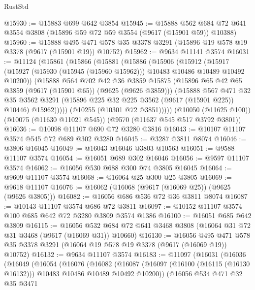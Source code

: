 \begin{lexlean}{RustStd}
\begin{coremodule}
{\begin{coremodule}
{{{{{{{{{{{{{{{{{{{{{{{{{{{{{{{{{@15930 := @15883 @699 @642 @3854
@15945 := @15888
    @562
    @684
    @72
    @641
    @3554
    @3808
    (@15896 @59 @72 @59 @3554 (@9617 (@15901 @59)) @10388)
@15960 := @15888
    @495
    @471
    @578
    @35
    @3378
    @3291
    (@15896 @19 @578 @19 @3378 (@9617 (@15901 @19)) @10752)
@15962 := @9634 @11141 @3574
@16031 := @11124
    (@15861
      (@15866
        (@15881
          (@15886
            (@15906
              (@15912
                (@15917
                  (@15927 (@15930 (@15945 (@15960 @15962))) @10483 @10486 @10489 @10492 @10200))
                (@15888
                  @564
                  @702
                  @42
                  @36
                  @3859
                  @15875
                  (@15896 @65 @42 @65 @3859 (@9617 (@15901 @65)) (@9625 (@9626 @3859)))
                  (@15888
                    @567
                    @471
                    @32
                    @35
                    @3562
                    @3291
                    (@15896 @225 @32 @225 @3562 (@9617 (@15901 @225)) @10446)
                    @15962)))))
          (@10255 (@10301 @72 @3851)))))
    (@10050 (@11625 @100))
    (@10075 (@11630 @11021 @545))
    (@9570 (@11637 @545 @517 @3792 @3801))
@16036 := @10098 @11107 @690 @72 @3280 @3816
@16043 := @10107 @11107 @3574 @545 @72 @689 @302 @3280
@16045 := @3287 @3811 @8074
@16046 := @3806 @16045
@16049 := @16043 @16046 @3803 @10563
@16051 := @9588 @11107 @3574
@16054 := @16051 @689 @302 @16046
@16056 := @9597 @11107 @3574
@16062 := @16056 @530 @688 @300 @74 @3805 @16045
@16064 := @9609 @11107 @3574
@16068 := @16064 @25 @300 @25 @3805
@16069 := @9618 @11107
@16076 := @16062 (@16068 (@9617 (@16069 @25)) (@9625 (@9626 @3805)))
@16082 := @16056 @686 @536 @72 @36 @3811 @8074
@16087 := @10143 @11107 @3574 @686 @72 @3811
@16097 := @10152 @11107 @3574 @100 @685 @642 @72 @3280 @3809 @3574 @1386
@16100 := @16051 @685 @642 @3809
@16115 := @16056
    @532
    @684
    @72
    @641
    @3468
    @3808
    (@16064 @31 @72 @31 @3468 (@9617 (@16069 @31)) @10660)
@16130 := @16056
    @495
    @471
    @578
    @35
    @3378
    @3291
    (@16064 @19 @578 @19 @3378 (@9617 (@16069 @19)) @10752)
@16132 := @9634 @11107 @3574
@16183 := @11097
    (@16031
      (@16036
        (@16049
          (@16054
            (@16076
              (@16082
                (@16087
                  (@16097 (@16100 (@16115 (@16130 @16132))) @10483 @10486 @10489 @10492 @10200))
                (@16056
                  @534
                  @471
                  @32
                  @35
                  @3471
}}}}}}}}}}}}}}}}}}}}}}}}}}}}}}}}}
\end{coremodule}}
\end{coremodule}
\end{lexlean}
